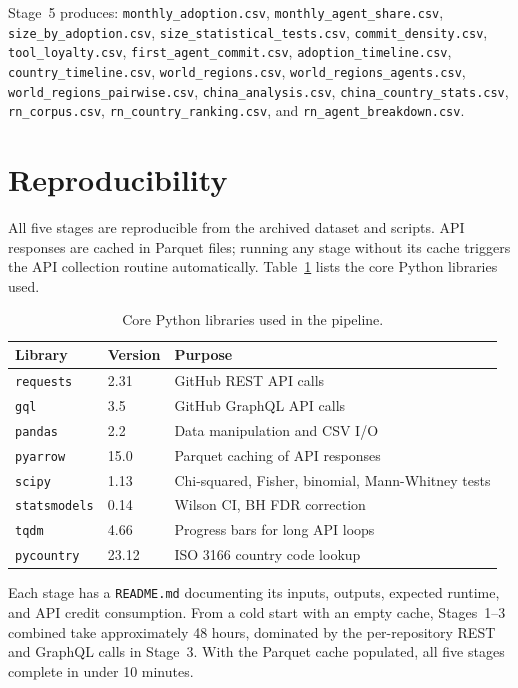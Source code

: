 Stage~5 produces: \texttt{monthly\_adoption.csv}, \texttt{monthly\_agent\_share.csv}, \texttt{size\_by\_adoption.csv}, \texttt{size\_statistical\_tests.csv}, \texttt{commit\_density.csv}, \texttt{tool\_loyalty.csv}, \texttt{first\_agent\_commit.csv}, \texttt{adoption\_timeline.csv}, \texttt{country\_timeline.csv}, \texttt{world\_regions.csv}, \texttt{world\_regions\_agents.csv}, \texttt{world\_regions\_pairwise.csv}, \texttt{china\_analysis.csv}, \texttt{china\_country\_stats.csv}, \texttt{rn\_corpus.csv}, \texttt{rn\_country\_ranking.csv}, and \texttt{rn\_agent\_breakdown.csv}.

\section{Reproducibility}
\label{sec:impl:reproducibility}

All five stages are reproducible from the archived dataset and scripts. API responses are cached in Parquet files; running any stage without its cache triggers the API collection routine automatically. Table~\ref{tab:libraries} lists the core Python libraries used.

\begin{table}[h]
\centering
\caption{Core Python libraries used in the pipeline.}
\label{tab:libraries}
\begin{tabular}{@{}lll@{}}
\toprule
Library & Version & Purpose \\
\midrule
\texttt{requests}      & 2.31  & GitHub REST API calls \\
\texttt{gql}           & 3.5   & GitHub GraphQL API calls \\
\texttt{pandas}        & 2.2   & Data manipulation and CSV I/O \\
\texttt{pyarrow}       & 15.0  & Parquet caching of API responses \\
\texttt{scipy}         & 1.13  & Chi-squared, Fisher, binomial, Mann-Whitney tests \\
\texttt{statsmodels}   & 0.14  & Wilson CI, BH FDR correction \\
\texttt{tqdm}          & 4.66  & Progress bars for long API loops \\
\texttt{pycountry}     & 23.12 & ISO 3166 country code lookup \\
\bottomrule
\end{tabular}
\end{table}

Each stage has a \texttt{README.md} documenting its inputs, outputs, expected runtime, and API credit consumption. From a cold start with an empty cache, Stages~1--3 combined take approximately 48 hours, dominated by the per-repository REST and GraphQL calls in Stage~3. With the Parquet cache populated, all five stages complete in under 10 minutes.
